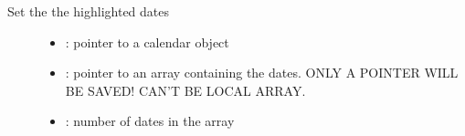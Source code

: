 \documentclass[letterpaper,10pt,english]{sphinxmanual}
\begin{document}
\begin{fulllineitems}
\label{\detokenize{object-types/calendar:_CPPv433lv_calendar_set_highlighted_datesP8lv_obj_tP18lv_calendar_date_t8uint16_t}}%
\pysigstartmultiline
{}\label{\detokenize{object-types/calendar:lv__calendar_8h_1a7ffd1db1246b3b86367b12c48cc6f77d}}%
\pysigstopmultiline
Set the the highlighted dates \begin{description}
\item[{}] \leavevmode\begin{itemize}
\item {} 
: pointer to a calendar object 

\item {} 
: pointer to an  array containing the dates. ONLY A POINTER WILL BE SAVED! CAN’T BE LOCAL ARRAY. 

\item {} 
: number of dates in the array 

\end{itemize}

\end{description}


\end{fulllineitems}

\end{document}
